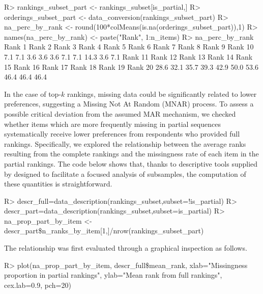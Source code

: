 \begin{example*}
R> rankings\_subset\_part <- rankings\_subset[is\_partial,]
R> orderings\_subset\_part <- data\_conversion(rankings\_subset\_part)
R> na\_perc\_by\_rank <- round(100*colMeans(is.na(orderings\_subset\_part)),1)
R> names(na\_perc\_by\_rank) <- paste("Rank", 1:n\_items)
R> na\_perc\_by\_rank
 Rank 1  Rank 2  Rank 3  Rank 4  Rank 5  Rank 6  Rank 7  Rank 8  Rank 9 Rank 10 
    7.1     7.1     3.6     3.6     3.6     7.1     7.1    14.3     3.6     7.1 
Rank 11 Rank 12 Rank 13 Rank 14 Rank 15 Rank 16 Rank 17 Rank 18 Rank 19 Rank 20 
   28.6    32.1    35.7    39.3    42.9    50.0    53.6    46.4    46.4    46.4
\end{example*}


In the case of top-$k$ rankings, missing data could be significantly related to lower preferences, suggesting a Missing Not At Random (MNAR) process. To assess 
a possible critical deviation from the assumed MAR mechanism, we checked whether items which are more frequently missing in partial sequences systematically receive lower preferences from respondents who provided full rankings. Specifically, we explored the relationship between the average ranks resulting from the complete rankings and the missingness rate of each item in the partial rankings. The code below shows that, thanks to descriptive tools supplied by  designed to facilitate a focused analysis of subsamples, the computation of these quantities is straightforward. 
%
\begin{example*}
R> descr\_full=data\_description(rankings\_subset,subset=!is\_partial)
R> descr\_part=data\_description(rankings\_subset,subset=is\_partial)
R> na\_prop\_part\_by\_item <- descr\_part\$n\_ranks\_by\_item[1,]/nrow(rankings\_subset\_part)
\end{example*}
%
The relationship was first evaluated through a graphical inspection as follows.
%
\begin{example*}
R> plot(na\_prop\_part\_by\_item, descr\_full\$mean\_rank, 
     xlab="Missingness proportion in partial rankings", 
     ylab="Mean rank from full rankings", 
     cex.lab=0.9, pch=20)
\end{example*}
%
